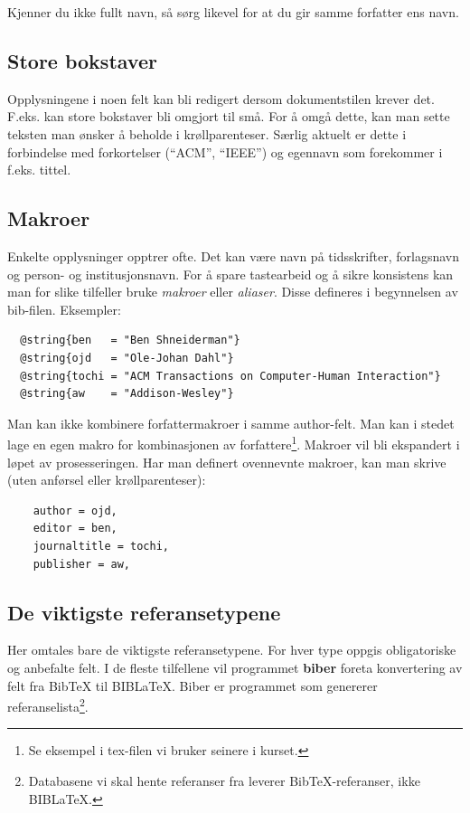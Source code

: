 \documentclass[11pt,norsk,a4paper]{article}
\newcommand{\bt}{BibTeX{}}
\newcommand{\blt}{B{\smaller[2]IB}\discretionary{-}{}{\kern
    -0.12em}\LaTeX{}}
\begin{document}
Kjenner du ikke fullt navn, så sørg likevel for at du gir samme forfatter ens navn.

\subsection*{Store bokstaver }
Opplysningene i noen felt kan bli redigert dersom dokumentstilen krever
det. F.eks. kan store bokstaver bli omgjort til små. For å omgå dette,
kan man sette teksten man ønsker å beholde i krøllparenteser. Særlig
aktuelt er dette i forbindelse med forkortelser (``ACM'', ``IEEE'') og
egennavn som forekommer i f.eks. tittel. 


\subsection{Makroer\label{makroer}}
Enkelte opplysninger opptrer ofte. Det kan være navn på tidsskrifter,
forlagsnavn og person- og institusjonsnavn. For å spare tastearbeid og
å sikre konsistens kan man for slike tilfeller bruke
\textit{makroer} eller \textit{aliaser}. Disse defineres i begynnelsen av
bib-filen. Eksempler:

{\footnotesize
\begin{verbatim}
  @string{ben   = "Ben Shneiderman"}
  @string{ojd   = "Ole-Johan Dahl"}
  @string{tochi = "ACM Transactions on Computer-Human Interaction"}
  @string{aw    = "Addison-Wesley"}
\end{verbatim}
}

\noindent{}Man kan ikke kombinere forfattermakroer i samme author-felt. 
Man kan i stedet lage en egen makro for kombinasjonen av forfattere\footnote{Se eksempel 
i tex-filen vi bruker seinere i kurset.}. Makroer vil bli ekspandert i løpet av prosesseringen. 
Har man definert ovennevnte makroer, kan man skrive (uten anførsel eller krøllparenteser):
{\footnotesize\begin{verbatim}
    author = ojd,
    editor = ben,
    journaltitle = tochi,
    publisher = aw,
\end{verbatim}}

\subsection{De viktigste referansetypene}\label{bibtextyper}

Her omtales bare de viktigste referansetypene. For hver type oppgis
obligatoriske og anbefalte felt. I de fleste tilfellene vil programmet \textbf{biber} foreta
konvertering av felt fra \bt{} til \blt. Biber er programmet som
genererer referanselista\footnote{Databasene vi skal hente referanser
  fra leverer \bt-referanser, ikke \blt.}.
\end{document}
